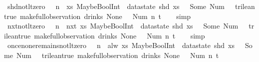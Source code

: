 \begin{isabellebody}
\ shd{\isacharunderscore}not{\isacharunderscore}lt{\isacharunderscore}zero{\isacharcolon}\ {\isachardoublequoteopen}{}\ {\isasymle}\ n\ {\isasymLongrightarrow}\ {\isacharparenleft}{\isasymlambda}xs{\isachardot}\ MaybeBoolInt\ {\isacharparenleft}{\isacharless}{\isacharparenright}\ {\isacharparenleft}datastate\ {\isacharparenleft}shd\ xs{\isacharparenright}\ {\isachardollar}\ {}{\isacharparenright}\ {\isacharparenleft}Some\ {\isacharparenleft}Num\ {}{\isacharparenright}{\isacharparenright}\ {\isasymnoteq}\ trilean{\isachardot}true{\isacharparenright}\ {\isacharparenleft}make{\isacharunderscore}full{\isacharunderscore}observation\ drinks\ None\ {\isacharparenleft}{\isacharless}{\isachargreater}{\isacharparenleft}{}\ {\isacharcolon}{\isacharequal}\ Num\ n{\isacharparenright}{\isacharparenright}\ t{\isacharparenright}{\isachardoublequoteclose}\isanewline
%
\isadelimproof
\ \ %
\endisadelimproof
%
\isatagproof
{}\isamarkupfalse%
\ simp%
\endisatagproof
{\isafoldproof}%
%
\isadelimproof
\isanewline
%
\endisadelimproof
\isanewline
{}\isamarkupfalse%
\ nxt{\isacharunderscore}not{\isacharunderscore}lt{\isacharunderscore}zero{\isacharcolon}\ {\isachardoublequoteopen}{}\ {\isasymle}\ n\ {\isasymLongrightarrow}\ nxt\ {\isacharparenleft}{\isasymlambda}xs{\isachardot}\ MaybeBoolInt\ {\isacharparenleft}{\isacharless}{\isacharparenright}\ {\isacharparenleft}datastate\ {\isacharparenleft}shd\ xs{\isacharparenright}\ {\isachardollar}\ {}{\isacharparenright}\ {\isacharparenleft}Some\ {\isacharparenleft}Num\ {}{\isacharparenright}{\isacharparenright}\ {\isasymnoteq}\ trilean{\isachardot}true{\isacharparenright}\ {\isacharparenleft}make{\isacharunderscore}full{\isacharunderscore}observation\ drinks\ None\ {\isacharparenleft}{\isacharless}{\isachargreater}{\isacharparenleft}{}\ {\isacharcolon}{\isacharequal}\ Num\ n{\isacharparenright}{\isacharparenright}\ t{\isacharparenright}{\isachardoublequoteclose}\isanewline
%
\isadelimproof
\ \ %
\endisadelimproof
%
\isatagproof
{}\isamarkupfalse%
\ simp%
\endisatagproof
{\isafoldproof}%
%
\isadelimproof
\isanewline
%
\endisadelimproof
\isanewline
{}\isamarkupfalse%
\ once{\isacharunderscore}none{\isacharunderscore}remains{\isacharunderscore}not{\isacharunderscore}lt{\isacharunderscore}zero{\isacharcolon}\ {\isachardoublequoteopen}{}\ {\isasymle}\ n\ {\isasymLongrightarrow}\ alw\ {\isacharparenleft}{\isasymlambda}xs{\isachardot}\ MaybeBoolInt\ {\isacharparenleft}{\isacharless}{\isacharparenright}\ {\isacharparenleft}datastate\ {\isacharparenleft}shd\ xs{\isacharparenright}\ {\isachardollar}\ {}{\isacharparenright}\ {\isacharparenleft}Some\ {\isacharparenleft}Num\ {}{\isacharparenright}{\isacharparenright}\ {\isasymnoteq}\ trilean{\isachardot}true{\isacharparenright}\ {\isacharparenleft}make{\isacharunderscore}full{\isacharunderscore}observation\ drinks\ None\ {\isacharparenleft}{\isacharless}{\isachargreater}{\isacharparenleft}{}\ {\isacharcolon}{\isacharequal}\ Num\ n{\isacharparenright}{\isacharparenright}\ t{\isacharparenright}{\isachardoublequoteclose}\isanewline

\end{isabellebody}
